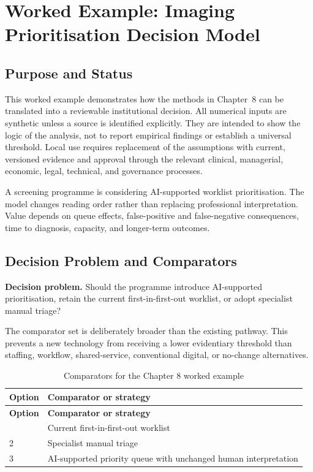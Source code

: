 \section{Worked Example: Imaging Prioritisation Decision Model}
\label{sec:comp-ch08-worked-example}

\subsection{Purpose and Status}
This worked example demonstrates how the methods in Chapter~8 can be
translated into a reviewable institutional decision. All numerical inputs are
synthetic unless a source is identified explicitly. They are intended to show the
logic of the analysis, not to report empirical findings or establish a universal
threshold. Local use requires replacement of the assumptions with current,
versioned evidence and approval through the relevant clinical, managerial,
economic, legal, technical, and governance processes.

A screening programme is considering AI-supported worklist prioritisation. The model changes reading order rather than replacing professional interpretation. Value depends on queue effects, false-positive and false-negative consequences, time to diagnosis, capacity, and longer-term outcomes. 

\subsection{Decision Problem and Comparators}
\textbf{Decision problem.} Should the programme introduce AI-supported prioritisation, retain the current first-in-first-out worklist, or adopt specialist manual triage?

The comparator set is deliberately broader than the existing pathway. This prevents
a new technology from receiving a lower evidentiary threshold than staffing,
workflow, shared-service, conventional digital, or no-change alternatives.

\begin{longtable}{@{}p{}p{}@{}}
\caption{Comparators for the Chapter 8 worked example}
\label{tab:comp-ch08-comparators}\\
\toprule
\textbf{Option} & \textbf{Comparator or strategy} \\
\midrule
\endfirsthead
\toprule
\textbf{Option} & \textbf{Comparator or strategy} \\
\midrule
\endhead
\bottomrule
\endlastfoot
1 & Current first-in-first-out worklist \\
2 & Specialist manual triage \\
3 & AI-supported priority queue with unchanged human interpretation \\
\end{longtable}

